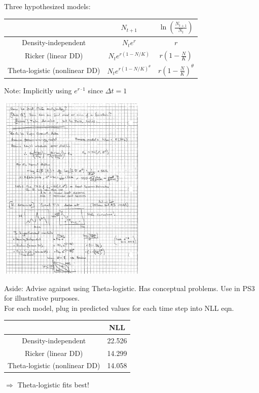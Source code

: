 \documentclass{article}
\newcommand{\note}[1]{\colorbox{gray!30}{#1}}
\newcommand{\ind}{\-\hspace{1cm}}
\begin{document}
Three hypothesized models:\\
\begin{tabular}{|c|c|c|}
\hline
   & $N_{t+1}$ & $\ln \left(\frac{N_{t+1}}{N_t} \right)$ \\ 
 \hline
Density-independent & $N_t e^r$ & $r$ \\ 
Ricker (linear DD) & $N_t e^{r(1-N/K)}$ & $r\left(1-\frac{N}{K}\right)$ \\
Theta-logistic (nonlinear DD) & $N_t e^{r(1-N/K)^\theta}$ & $r\left(1-\frac{N}{K}\right)^\theta$ \\
\hline
\end{tabular}
Note:  Implicitly using $e^{r\cdot 1}$ since $\Delta t = 1$\\
\begin{center}
	\includegraphics[width=7cm]{figs/image8.pdf}
\end{center}

\note{Aside:  Advise against using Theta-logistic.  Has conceptual problems.  Use in PS3  for illustrative purposes.}\\

For each model, plug in predicted values for each time step into NLL eqn.\\

\begin{tabular}{|c|c|}
\hline
   & NLL \\ 
 \hline
Density-independent & 22.526 \\ 
Ricker (linear DD) & 14.299 \\
Theta-logistic (nonlinear DD) & 14.058 \\
\hline
\end{tabular}
\ind $\Rightarrow$ Theta-logistic fits best!\\
\end{document}

